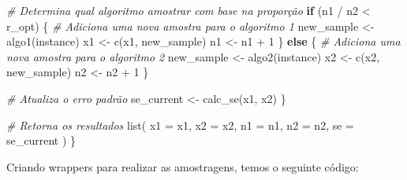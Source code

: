 \documentclass[
]{article}
\newenvironment{Shaded}{\begin{snugshade}}{\end{snugshade}}
\newcommand{\AttributeTok}[1]{\textcolor[rgb]{0.77,0.63,0.00}{#1}}
\newcommand{\CommentTok}[1]{\textcolor[rgb]{0.56,0.35,0.01}{\textit{#1}}}
\newcommand{\ControlFlowTok}[1]{\textcolor[rgb]{0.13,0.29,0.53}{\textbf{#1}}}
\newcommand{\DecValTok}[1]{\textcolor[rgb]{0.00,0.00,0.81}{#1}}
\newcommand{\FunctionTok}[1]{\textcolor[rgb]{0.00,0.00,0.00}{#1}}
\newcommand{\NormalTok}[1]{#1}
\newcommand{\OtherTok}[1]{\textcolor[rgb]{0.56,0.35,0.01}{#1}}
\newcommand{\SpecialCharTok}[1]{\textcolor[rgb]{0.00,0.00,0.00}{#1}}
\begin{document}
\begin{Shaded}
\begin{Highlighting}[]
    \CommentTok{\# Determina qual algoritmo amostrar com base na proporção}
    \ControlFlowTok{if}\NormalTok{ (n1 }\SpecialCharTok{/}\NormalTok{ n2 }\SpecialCharTok{\textless{}}\NormalTok{ r\_opt) \{}
      \CommentTok{\# Adiciona uma nova amostra para o algoritmo 1}
\NormalTok{      new\_sample }\OtherTok{\textless{}{-}} \FunctionTok{algo1}\NormalTok{(instance)}
\NormalTok{      x1 }\OtherTok{\textless{}{-}} \FunctionTok{c}\NormalTok{(x1, new\_sample)}
\NormalTok{      n1 }\OtherTok{\textless{}{-}}\NormalTok{ n1 }\SpecialCharTok{+} \DecValTok{1}
\NormalTok{    \} }\ControlFlowTok{else}\NormalTok{ \{}
      \CommentTok{\# Adiciona uma nova amostra para o algoritmo 2}
\NormalTok{      new\_sample }\OtherTok{\textless{}{-}} \FunctionTok{algo2}\NormalTok{(instance)}
\NormalTok{      x2 }\OtherTok{\textless{}{-}} \FunctionTok{c}\NormalTok{(x2, new\_sample)}
\NormalTok{      n2 }\OtherTok{\textless{}{-}}\NormalTok{ n2 }\SpecialCharTok{+} \DecValTok{1}
\NormalTok{    \}}
    
    \CommentTok{\# Atualiza o erro padrão}
\NormalTok{    se\_current }\OtherTok{\textless{}{-}} \FunctionTok{calc\_se}\NormalTok{(x1, x2)}
\NormalTok{  \}}
  
  \CommentTok{\# Retorna os resultados}
  \FunctionTok{list}\NormalTok{(}
    \AttributeTok{x1 =}\NormalTok{ x1,}
    \AttributeTok{x2 =}\NormalTok{ x2,}
    \AttributeTok{n1 =}\NormalTok{ n1,}
    \AttributeTok{n2 =}\NormalTok{ n2,}
    \AttributeTok{se =}\NormalTok{ se\_current}
\NormalTok{  )}
\NormalTok{\}}
\end{Highlighting}
\end{Shaded}

Criando wrappers para realizar as amostragens, temos o seguinte código:
\end{document}
